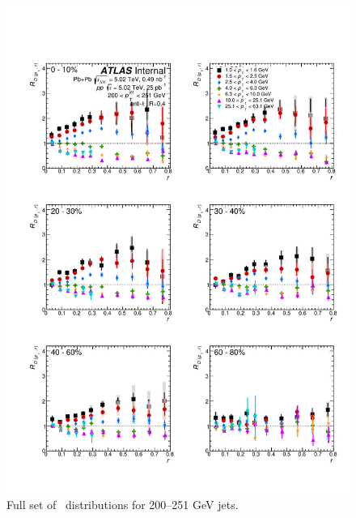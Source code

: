 \begin{figure}[h]
\includegraphics[width=1.0\textwidth]{figures/results/RDpT_dR_jet9.pdf}
\caption{Full set of \RDptr\ distributions for 200--251 GeV jets.}
\label{fig:fullset_rptr_j9}
\end{figure}

